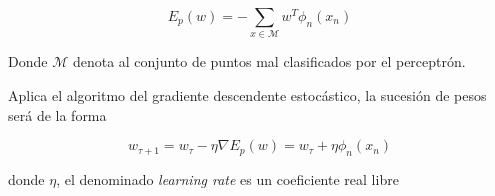 \begin{equation}
    E_p(w) = - \sum_{x \in \mathcal M} w^T \phi_n (x_n)
\end{equation}

Donde $\mathcal M$ denota al conjunto de puntos mal clasificados por el perceptrón.

Aplica el algoritmo del gradiente descendente estocástico, la sucesión de pesos será de la forma

\begin{equation}
    w_{\tau+1} = 
    w_{\tau} - \eta \nabla E_p(w)
     = 
     w_{\tau} + \eta \phi_n (x_n)
\end{equation}

donde $\eta$, el denominado  \textit{learning rate}
es un coeficiente real libre




